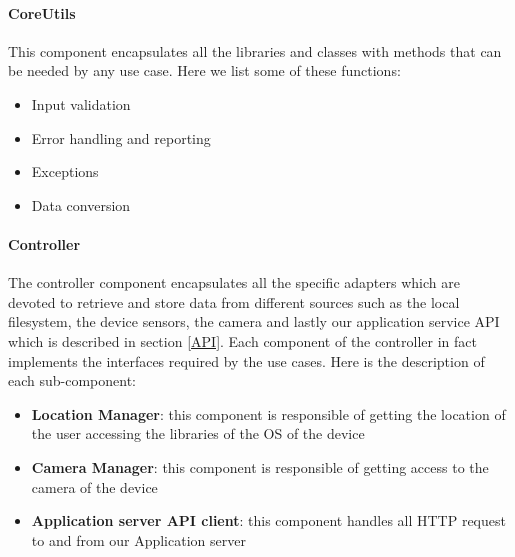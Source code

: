 \paragraph{CoreUtils}
This component encapsulates all the libraries and classes with methods that can be needed by any use case.
Here we list some of these functions:
\begin{itemize}
  \item Input validation
  \item Error handling and reporting
  \item Exceptions
  \item Data conversion
\end{itemize}

\paragraph{Controller}
The controller component  encapsulates all the specific adapters which are devoted to retrieve and store data from different sources such as the local filesystem, the device sensors, the camera and lastly our application service API which is described in section \ref{API}.
Each component of the controller in fact implements the interfaces required by the use cases.
Here is the description of each sub-component:
\begin{itemize}
  \item \textbf{Location Manager}: this component is responsible of getting the location of the user accessing the libraries of the OS of the device
  \item \textbf{Camera Manager}: this component is responsible of getting access to the camera of the device
  \item \textbf{Application server API client}: this component handles all HTTP request to and from our Application server
\end{itemize}

